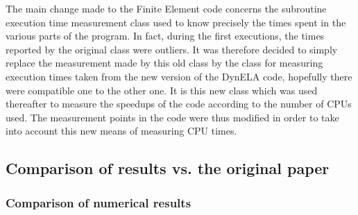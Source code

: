 The main change made to the Finite Element code concerns the subroutine execution time measurement class used to know precisely the times spent in the various parts of the program. In fact, during the first executions, the times reported by the original class were outliers. It was therefore decided to simply replace the measurement made by this old class by the class for measuring execution times taken from the new version of the DynELA code, hopefully there were compatible one to the other one. It is this new class which was used thereafter to measure the speedups of the code according to the number of CPUs used. The measurement points in the code were thus modified in order to take into account this new means of measuring CPU times.

\subsection{Comparison of results vs. the original paper}

\subsubsection{Comparison of numerical results}\label{Ptensile}

